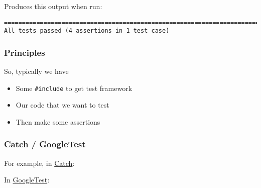 Produces this output when run:

\begin{verbatim}
===============================================================================
All tests passed (4 assertions in 1 test case)

\end{verbatim}

\subsubsection{Principles}\label{principles}

So, typically we have

\begin{itemize}
\itemsep1pt\parskip0pt
\item
  Some \texttt{\#include} to get test framework
\item
  Our code that we want to test
\item
  Then make some assertions
\end{itemize}

\subsubsection{Catch / GoogleTest}\label{catch-googletest}

For example, in \href{https://github.com/philsquared/Catch}{Catch}:

\begin{Shaded}
\begin{Highlighting}[]
    \NormalTok{, } \NormalTok{) \{}
        \NormalTok{) == } \NormalTok{);}
        \NormalTok{) == } \NormalTok{);}
    \NormalTok{\}}
\end{Highlighting}
\end{Shaded}

In \href{https://code.google.com/p/googletest/}{GoogleTest}:

\begin{Shaded}
\begin{Highlighting}[]
      \NormalTok{));}
      \NormalTok{));}
    \NormalTok{\}}
\end{Highlighting}
\end{Shaded}

